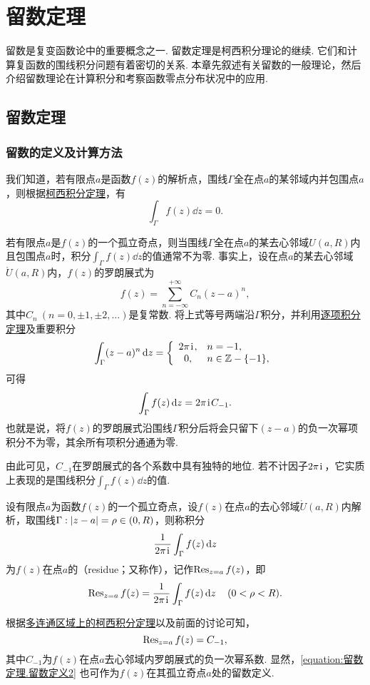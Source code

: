\chapter{留数定理}
留数是复变函数论中的重要概念之一.
留数定理是柯西积分理论的继续.
它们和计算复函数的围线积分问题有着密切的关系.
本章先叙述有关留数的一般理论，然后介绍留数理论在计算积分和考察函数零点分布状况中的应用.

\section{留数定理}
\subsection{留数的定义及计算方法}
我们知道，若有限点\(a\)是函数\(f(z)\)的解析点，围线\(\Gamma\)全在点\(a\)的某邻域内并包围点\(a\)，则根据\hyperref[theorem:解析函数的积分表示.柯西积分定理]{柯西积分定理}，有\[
\int_{\Gamma} f(z) \dd{z} = 0.
\]

若有限点\(a\)是\(f(z)\)的一个孤立奇点，则当围线\(\Gamma\)全在点\(a\)的某去心邻域\(U(a,R)\)内且包围点\(a\)时，积分\(\int_{\Gamma} f(z) \dd{z}\)的值通常不为零.
事实上，设在点\(a\)的某去心邻域\(\mathring{U}(a,R)\)内，\(f(z)\)的罗朗展式为\[
f(z) = \sum\limits_{n=-\infty}^{+\infty} C_n (z-a)^n,
\]其中\(C_n\ (n=0,\pm1,\pm2,\dotsc)\)是复常数.
将上式等号两端沿\(\Gamma\)积分，并利用\hyperref[theorem:解析函数的级数表示.一致收敛级数的基本性质2]{逐项积分定理}及重要积分  \[
\int_{\Gamma} (z-a)^n \dd{z} = \left\{ \begin{array}{cl}
2\pi\kern1pt\mathrm{i}\kern1pt, & n=-1, \\
0,& n\in\mathbb{Z}-\{-1\},
\end{array} \right.
\]可得\[
\int_{\Gamma} f(z) \dd{z} = 2\pi\kern1pt\mathrm{i}\kern1pt C_{-1}.
\]也就是说，将\(f(z)\)的罗朗展式沿围线\(\Gamma\)积分后将会只留下\((z-a)\)的负一次幂项积分不为零，其余所有项积分通通为零.

由此可见，\(C_{-1}\)在罗朗展式的各个系数中具有独特的地位.
若不计因子\(2\pi\kern1pt\mathrm{i}\kern1pt\)，它实质上表现的是围线积分\(\int_{\Gamma} f(z) \dd{z}\)的值.

\begin{definition}
设有限点\(a\)为函数\(f(z)\)的一个孤立奇点，设\(f(z)\)在点\(a\)的去心邻域\(\mathring{U}(a,R)\)内解析，取围线\(\Gamma: \abs{z-a}=\rho\in(0,R)\)，则称积分\[
\frac{1}{2\pi\kern1pt\mathrm{i}\kern1pt} \int_{\Gamma} f(z) \dd{z}
\]为\(f(z)\)在点\(a\)的（residue；又称作），记作\(\operatorname{Res}_{z=a} f(z)\)，即\begin{equation}\label{equation:留数定理.留数定义1}
\operatorname{Res}_{z=a} f(z)
= \frac{1}{2\pi\kern1pt\mathrm{i}\kern1pt} \int_{\Gamma} f(z) \dd{z}
\quad(0<\rho<R).
\end{equation}
\end{definition}
根据\hyperref[theorem:解析函数的积分表示.多连通区域的柯西积分定理]{多连通区域上的柯西积分定理}以及前面的讨论可知，\begin{equation}\label{equation:留数定理.留数定义2}
\operatorname{Res}_{z=a} f(z) = C_{-1},
\end{equation}
其中\(C_{-1}\)为\(f(z)\)在点\(a\)去心邻域内罗朗展式的负一次幂系数.
显然，\cref{equation:留数定理.留数定义2} 也可作为\(f(z)\)在其孤立奇点\(a\)处的留数定义.

